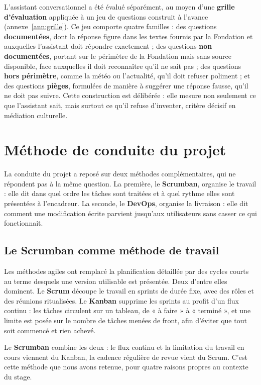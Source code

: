 L'assistant conversationnel a été évalué séparément, au moyen d'une
\textbf{grille d'évaluation} appliquée à un jeu de questions construit à
l'avance (annexe~\ref{ann:grille}). Ce jeu comporte quatre familles : des
questions \textbf{documentées}, dont la réponse figure dans les textes fournis
par la Fondation et auxquelles l'assistant doit répondre exactement ; des
questions \textbf{non documentées}, portant sur le périmètre de la Fondation
mais sans source disponible, face auxquelles il doit reconnaître qu'il ne sait
pas ; des questions \textbf{hors périmètre}, comme la météo ou l'actualité,
qu'il doit refuser poliment ; et des questions \textbf{pièges}, formulées de
manière à suggérer une réponse fausse, qu'il ne doit pas suivre. Cette
construction est délibérée : elle mesure non seulement ce que l'assistant sait,
mais surtout ce qu'il refuse d'inventer, critère décisif en médiation
culturelle.
\section{Méthode de conduite du projet}
\label{sec:devops}

La conduite du projet a reposé sur deux méthodes complémentaires, qui ne
répondent pas à la même question. La première, le \textbf{Scrumban}, organise le
travail : elle dit dans quel ordre les tâches sont traitées et à quel rythme
elles sont présentées à l'encadreur. La seconde, le \textbf{DevOps}, organise la
livraison : elle dit comment une modification écrite parvient jusqu'aux
utilisateurs sans casser ce qui fonctionnait.

\subsection{Le Scrumban comme méthode de travail}

Les méthodes agiles ont remplacé la planification détaillée par des cycles
courts au terme desquels une version utilisable est présentée. Deux d'entre
elles dominent. Le \textbf{Scrum} découpe le travail en sprints de durée fixe,
avec des rôles et des réunions ritualisées. Le \textbf{Kanban} supprime les
sprints au profit d'un flux continu : les tâches circulent sur un tableau, de
« à faire » à « terminé », et une limite est posée sur le nombre de tâches
menées de front, afin d'éviter que tout soit commencé et rien achevé.

Le \textbf{Scrumban} combine les deux : le flux continu et la limitation du
travail en cours viennent du Kanban, la cadence régulière de revue vient du
Scrum. C'est cette méthode que nous avons retenue, pour quatre raisons propres
au contexte du stage.

